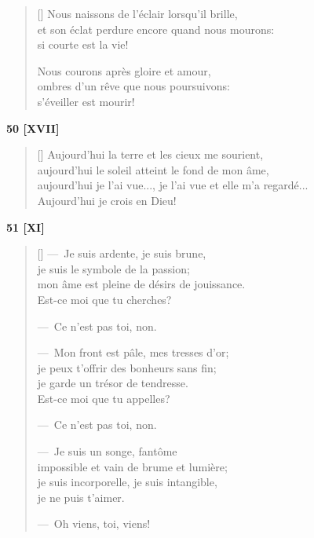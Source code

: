 \documentclass[a4paper,12pt]{book}
\begin{document}
\begin{verse}[\versewidth]
  Nous naissons de l'éclair lorsqu'il brille, \\
  et son éclat perdure encore quand nous mourons: \\
  si courte est la vie!

  Nous courons après gloire et amour, \\
  ombres d'un rêve que nous poursuivons: \\
  s'éveiller est mourir!
\end{verse}

\bigskip

\begin{center}
  \textbf{50 [XVII]}
\end{center}

\settowidth{\versewidth}{aujourd'hui je l'ai vue..., je l'ai vue et elle m'a regardé...}

\begin{verse}[\versewidth]
  Aujourd'hui la terre et les cieux me sourient, \\
  aujourd'hui le soleil atteint le fond de mon âme, \\
  aujourd'hui je l'ai vue..., je l'ai vue et elle m'a regardé... \\
  Aujourd'hui je crois en Dieu!
\end{verse}

\bigskip

\begin{center}
  \textbf{51 [XI]}
\end{center}

\settowidth{\versewidth}{de désirs de jouissance mon âme est pleine.}

\begin{verse}[\versewidth]
  ---~Je suis ardente, je suis brune, \\
  je suis le symbole de la passion; \\
  mon âme est pleine de désirs de jouissance. \\
  Est-ce moi que tu cherches?

  \hfill ---~Ce n'est pas toi, non.

  ---~Mon front est pâle, mes tresses d'or; \\
  je peux t'offrir des bonheurs sans fin; \\
  je garde un trésor de tendresse. \\
  Est-ce moi que tu appelles?

  \hfill ---~Ce n'est pas toi, non.

  ---~Je suis un songe, fantôme \\
  impossible et vain de brume et lumière; \\
  je suis incorporelle, je suis intangible, \\
  je ne puis t'aimer.

  \hfill ---~Oh viens, toi, viens!
\end{verse}
\end{document}
